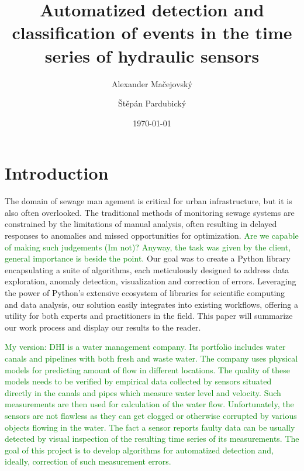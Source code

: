 \documentclass[12pt,a4paper]{article}
\title{Automatized detection and classification of events in the time series of hydraulic sensors}
\author{Alexander Ma\v{c}ejovsk\'{y} \and \v{S}t\v{e}p\'{a}n Pardubick\'{y}}
\date{\today}
\begin{document}

\maketitle %

\thispagestyle{empty} %

\clearpage %

\tableofcontents  


 

\newpage

\section{Introduction}
 
The domain of sewage man agement is critical for urban infrastructure, but it is also often overlooked.
The traditional methods of monitoring sewage systems are constrained by the limitations of manual analysis, often resulting in delayed responses to anomalies and missed opportunities for optimization.
\textcolor{green}{Are we capable of making such judgements (Im not)? Anyway, the task was given by the client, general importance is beside the point.}
Our goal was to create a Python library encapsulating a suite of algorithms, each meticulously designed to address data exploration, anomaly detection, visualization and correction of errors. Leveraging the power of Python's extensive ecosystem of libraries for scientific computing and data analysis, our solution easily integrates into existing workflows, offering a utility for both experts and practitioners in the field. This paper will summarize our work process and display our results to the reader.


\textcolor{green}{My version: DHI is a water management company. Its portfolio includes water canals and pipelines with both fresh and waste water. The company uses physical models for predicting amount of flow in different locations. The quality of these models needs to be verified by empirical data collected by sensors situated directly in the canals and pipes which measure water level and velocity. Such measurements are then used for calculation of the water flow. Unfortunately, the sensors are not flawless as they can get clogged or otherwise corrupted by various objects flowing in the water.   The fact a sensor reports faulty data can be usually detected by visual inspection of the resulting time series of its measurements. The goal of this project is to develop algorithms for automatized detection and, ideally, correction of such measurement errors.}
\end{document}
